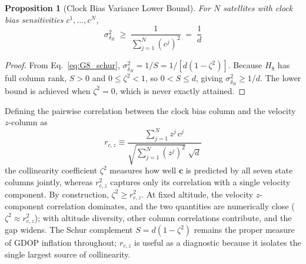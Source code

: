 \documentclass[letterpaper,times]{IONconf-v2}
\theoremstyle{plain}
\newtheorem{proposition}{Proposition}
\theoremstyle{remark}
\newtheorem{remark}{Remark}
\begin{document}
\begin{proposition}[Clock Bias Variance Lower Bound]\label{prop:clock_bias_bounds}
For $N$ satellites with clock bias sensitivities $c^1, \ldots, c^N$,
\begin{equation}
\sigma_{\delta_R}^2 \;\geq\; \frac{1}{\sum_{j=1}^N (c^j)^2} \;=\; \frac{1}{d}
\end{equation}
\end{proposition}

\begin{proof}
From Eq.~\eqref{eq:G8_schur}, $\sigma_{\delta_R}^2 = 1/S = 1/[d(1-\zeta^2)]$. Because $H_8$ has full column rank, $S > 0$ and $0 \leq \zeta^2 < 1$, so $0 < S \leq d$, giving $\sigma_{\delta_R}^2 \geq 1/d$. The lower bound is achieved when $\zeta^2 = 0$, which is never exactly attained.
\end{proof}

Defining the pairwise correlation between the clock bias column and the velocity $z$-column as
%
\begin{equation}\label{eq:rcz_def}
r_{c,z} \equiv \frac{\sum_{j=1}^N z^j\,c^j}{\sqrt{\sum_{j=1}^N (z^j)^2}\;\sqrt{d}}
\end{equation}
%
the collinearity coefficient $\zeta^2$ measures how well $\mathbf{c}$ is predicted by all seven state columns jointly, whereas $r_{c,z}^2$ captures only its correlation with a single velocity component. By construction, $\zeta^2 \geq r_{c,z}^2$. At fixed altitude, the velocity $z$-component correlation dominates, and the two quantities are numerically close ($\zeta^2 \approx r_{c,z}^2$); with altitude diversity, other column correlations contribute, and the gap widens. The Schur complement $S = d(1-\zeta^2)$ remains the proper measure of GDOP inflation throughout; $r_{c,z}$ is useful as a diagnostic because it isolates the single largest source of collinearity.
\end{document}
